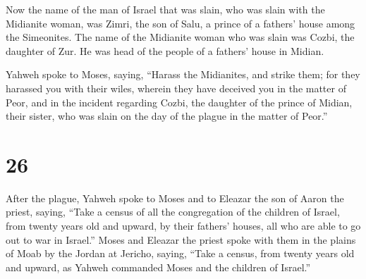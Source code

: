  Now the name of the man of Israel that was slain, who
was slain with the Midianite woman, was Zimri, the son of Salu, a prince
of a fathers' house among the Simeonites.  The name of
the Midianite woman who was slain was Cozbi, the daughter of Zur. He was
head of the people of a fathers' house in Midian.

 Yahweh spoke to Moses, saying,  ``Harass
the Midianites, and strike them;  for they harassed you
with their wiles, wherein they have deceived you in the matter of Peor,
and in the incident regarding Cozbi, the daughter of the prince of
Midian, their sister, who was slain on the day of the plague in the
matter of Peor.''

\hypertarget{section-25}{%
\section{26}\label{section-25}}

 After the plague, Yahweh spoke to Moses and to Eleazar
the son of Aaron the priest, saying,  ``Take a census of
all the congregation of the children of Israel, from twenty years old
and upward, by their fathers' houses, all who are able to go out to war
in Israel.''  Moses and Eleazar the priest spoke with them
in the plains of Moab by the Jordan at Jericho, saying, 
``Take a census, from twenty years old and upward, as Yahweh commanded
Moses and the children of Israel.''

